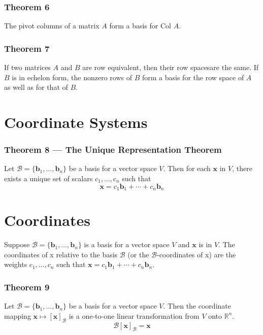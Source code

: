 \documentclass{article}
\begin{document}
\subsubsection*{Theorem 6}
The pivot columns of a matrix $A$ form a basis for $\text{Col } A$.

\subsubsection*{Theorem 7}
If two matrices $A$ and $B$ are row equivalent, then their row spacesare the same. If $B$ is in
echelon form, the nonzero rows of $B$ form a basis for the row space of $A$ as well as for that of
$B$.

\section*{Coordinate Systems}
\subsubsection*{Theorem 8 --- The Unique Representation Theorem}
Let $\mathcal{B}=\{\mathbf{b}_1, \ldots, \mathbf{b}_n\}$ be a basis for a vector space $V$. Then
for each $\mathbf{x}$ in $V$, there exists a unique set of scalars $c_1, \ldots, c_n$ such that
\[\mathbf{x}=c_1\mathbf{b}_1 + \cdots + c_n\mathbf{b}_n\]

\section*{Coordinates}
Suppose $\mathcal{B}=\{\mathbf{b}_1, \ldots, \mathbf{b}_n\}$ is a basis for a vector space $V$ and
$\mathbf{x}$ is in $V$. The coordinates of x relative to the basis $\mathcal{B}$ (or the
$\mathcal{B}$-coordinates of x) are the weights $c_1, \dots, c_n$ such that
$\mathbf{x}=c_1\mathbf{b}_1 + \cdots + c_n\mathbf{b}_n$.

\subsubsection*{Theorem 9}
Let $\mathcal{B} = \{\mathbf{b}_1, \ldots, \mathbf{b}_n\}$ be a basis for a vector space $V$. Then
the coordinate mapping $\mathbf{x} \mapsto {\left[ \mathbf{x} \right]}_{\mathcal{B}}$ is a
one-to-one linear transformation from $V$ onto $\mathbb{R}^n$. 
\[\mathcal{B}{\left[ \mathbf{x} \right]}_{\mathcal{B}}=\mathbf{x}\]
\end{document}
